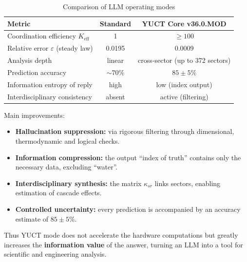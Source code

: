 \documentclass[12pt,a4paper]{article}
\begin{document}
	\begin{table}[H]
		\small
		\centering
		\caption{Comparison of LLM operating modes}
		\label{tab:comparison}
		\begin{tabular}{lcc}
			\toprule
			\textbf{Metric} & \textbf{Standard} & \textbf{YUCT Core v36.0.MOD} \\
			\midrule
			Coordination efficiency \(K_{\mathrm{eff}}\) & 1 & \(\ge 100\) \\
			Relative error \(\varepsilon\) (steady law) & 0.0195 & 0.0009 \\
			Analysis depth & linear & cross‑sector (up to 372 sectors) \\
			Prediction accuracy & \(\sim 70\%\) & \(85\pm5\%\) \\
			Information entropy of reply & high & low (index output) \\
			Interdisciplinary consistency & absent & active (filtering) \\
			\bottomrule
		\end{tabular}
	\end{table}
	
	Main improvements:
	\begin{itemize}
		\item \textbf{Hallucination suppression:} via rigorous filtering through dimensional, thermodynamic and logical checks.
		\item \textbf{Information compression:} the output ``index of truth'' contains only the necessary data, excluding ``water''.
		\item \textbf{Interdisciplinary synthesis:} the matrix \(\kappa_{sr}\) links sectors, enabling estimation of cascade effects.
		\item \textbf{Controlled uncertainty:} every prediction is accompanied by an accuracy estimate of \(85\pm5\%\).
	\end{itemize}
	
	Thus YUCT mode does not accelerate the hardware computations but greatly increases the \textbf{information value} of the answer, turning an LLM into a tool for scientific and engineering analysis.
	
\end{document}
